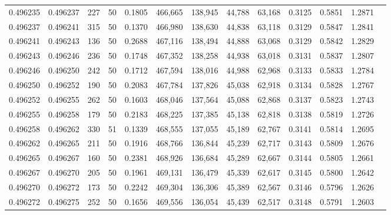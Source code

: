\begin{tabular}{rrrrrrrrrrrrr}
0.496235 & 0.496237 &   227 &  50 &                                     0.1805 & 466,665 & 138,945 &  44,788 &  63,168 & 0.3125 & 0.5851 & 1.2871 \\
0.496237 & 0.496241 &   315 &  50 &                                     0.1370 & 466,980 & 138,630 &  44,838 &  63,118 & 0.3129 & 0.5847 & 1.2841 \\
0.496241 & 0.496243 &   136 &  50 &                                     0.2688 & 467,116 & 138,494 &  44,888 &  63,068 & 0.3129 & 0.5842 & 1.2829 \\
0.496243 & 0.496246 &   236 &  50 &                                     0.1748 & 467,352 & 138,258 &  44,938 &  63,018 & 0.3131 & 0.5837 & 1.2807 \\
0.496246 & 0.496250 &   242 &  50 &                                     0.1712 & 467,594 & 138,016 &  44,988 &  62,968 & 0.3133 & 0.5833 & 1.2784 \\
0.496250 & 0.496252 &   190 &  50 &                                     0.2083 & 467,784 & 137,826 &  45,038 &  62,918 & 0.3134 & 0.5828 & 1.2767 \\
0.496252 & 0.496255 &   262 &  50 &                                     0.1603 & 468,046 & 137,564 &  45,088 &  62,868 & 0.3137 & 0.5823 & 1.2743 \\
0.496255 & 0.496258 &   179 &  50 &                                     0.2183 & 468,225 & 137,385 &  45,138 &  62,818 & 0.3138 & 0.5819 & 1.2726 \\
0.496258 & 0.496262 &   330 &  51 &                                     0.1339 & 468,555 & 137,055 &  45,189 &  62,767 & 0.3141 & 0.5814 & 1.2695 \\
0.496262 & 0.496265 &   211 &  50 &                                     0.1916 & 468,766 & 136,844 &  45,239 &  62,717 & 0.3143 & 0.5809 & 1.2676 \\
0.496265 & 0.496267 &   160 &  50 &                                     0.2381 & 468,926 & 136,684 &  45,289 &  62,667 & 0.3144 & 0.5805 & 1.2661 \\
0.496267 & 0.496270 &   205 &  50 &                                     0.1961 & 469,131 & 136,479 &  45,339 &  62,617 & 0.3145 & 0.5800 & 1.2642 \\
0.496270 & 0.496272 &   173 &  50 &                                     0.2242 & 469,304 & 136,306 &  45,389 &  62,567 & 0.3146 & 0.5796 & 1.2626 \\
0.496272 & 0.496275 &   252 &  50 &                                     0.1656 & 469,556 & 136,054 &  45,439 &  62,517 & 0.3148 & 0.5791 & 1.2603 \\

\end{tabular}
